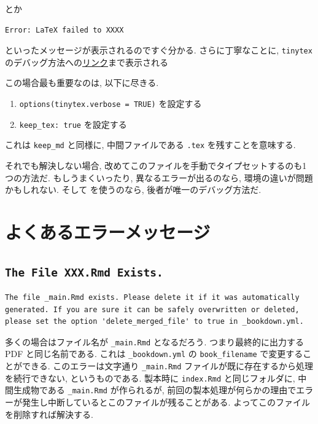 \documentclass[
  xelatex,ja=standard,jafont=noto]{bxjsbook}
\providecommand{\tightlist}{%
  \setlength{\itemsep}{0pt}\setlength{\parskip}{0pt}}
\theoremstyle{definition}
\theoremstyle{definition}
\theoremstyle{definition}
\theoremstyle{definition}
\theoremstyle{remark}
\begin{document}
とか

\begin{verbatim}
Error: LaTeX failed to XXXX
\end{verbatim}

といったメッセージが表示されるのですぐ分かる. さらに丁寧なことに,
\texttt{tinytex}
のデバッグ方法への\href{https://yihui.org/tinytex/r/\#debugging}{リンク}まで表示される

この場合最も重要なのは, 以下に尽きる.

\begin{enumerate}
\def\labelenumi{\arabic{enumi}.}
\tightlist
\item
  \texttt{options(tinytex.verbose\ =\ TRUE)} を設定する
\item
  \texttt{keep\_tex:\ true} を設定する
\end{enumerate}

これは \texttt{keep\_md} と同様に, 中間ファイルである \texttt{.tex}
を残すことを意味する.

それでも解決しない場合,
改めてこのファイルを手動でタイプセットするのも1つの方法だ.
もしうまくいったり, 異なるエラーが出るのなら,
環境の違いが問題かもしれない. そして \upBibTeX を使うのなら,
後者が唯一のデバッグ方法だ.

\hypertarget{ux3088ux304fux3042ux308bux30a8ux30e9ux30fcux30e1ux30c3ux30bbux30fcux30b8}{%
\section{よくあるエラーメッセージ}\label{ux3088ux304fux3042ux308bux30a8ux30e9ux30fcux30e1ux30c3ux30bbux30fcux30b8}}

\hypertarget{the-file-xxx.rmd-exists.}{%
\subsection{\texorpdfstring{\texttt{The\ File\ XXX.Rmd\ Exists.}}{The File XXX.Rmd Exists.}}\label{the-file-xxx.rmd-exists.}}

\begin{verbatim}
The file _main.Rmd exists. Please delete it if it was automatically generated. If you are sure it can be safely overwritten or deleted, please set the option 'delete_merged_file' to true in _bookdown.yml.
\end{verbatim}

多くの場合はファイル名が \texttt{\_main.Rmd} となるだろう.
つまり最終的に出力する PDF と同じ名前である. これは
\texttt{\_bookdown.yml} の \texttt{book\_filename}
で変更することができる. このエラーは文字通り \texttt{\_main.Rmd}
ファイルが既に存在するから処理を続行できない, というものである. 製本時に
\texttt{index.Rmd} と同じフォルダに, 中間生成物である
\texttt{\_main.Rmd} が作られるが,
前回の製本処理が何らかの理由でエラーが発生し中断しているとこのファイルが残ることがある.
よってこのファイルを削除すれば解決する.
\end{document}
